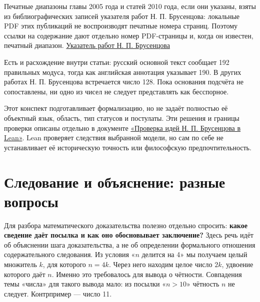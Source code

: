 \documentclass[12pt,a4paper]{article}
\begin{document}
Печатные диапазоны главы 2005 года и статей 2010 года, если они указаны, взяты из библиографических записей указателя работ Н. П. Брусенцова: локальные PDF этих публикаций не воспроизводят печатные номера страниц. Поэтому ссылки на содержание дают отдельно номер PDF-страницы и, когда он известен, печатный диапазон. \href{https://ternarycomp.cs.msu.ru/Brusentsov/Brusentsov_v2.html}{Указатель работ Н. П. Брусенцова}

Есть и расхождение внутри статьи: русский основной текст сообщает 192 правильных модуса, тогда как английская аннотация указывает 190. В других работах Н. П. Брусенцова встречается число 128. Пока основания подсчёта не сопоставлены, ни одно из чисел не следует представлять как бесспорное.

Этот конспект подготавливает формализацию, но не задаёт полностью её объектный язык, область, тип статусов и постулаты. Эти решения и границы проверки описаны отдельно в документе \href{../research/Проверка-идей-Брусенцова-в-Lean.tex}{«Проверка идей Н. П. Брусенцова в Lean»}. Lean проверяет следствия выбранной модели, но сам по себе не устанавливает её историческую точность или философскую предпочтительность.

\section{Следование и объяснение: разные вопросы}

Для разбора математического доказательства полезно отдельно спросить: \textbf{какое сведение даёт посылка и как оно обосновывает заключение?} Здесь речь идёт об объяснении шага доказательства, а не об определении формального отношения содержательного следования. Из условия «\(n\) делится на 4» мы получаем целый множитель \(k\), для которого \(n=4k\). Через него находим целое число \(2k\), удвоение которого даёт \(n\). Именно это требовалось для вывода о чётности. Совпадения темы «числа» для такого вывода мало: из посылки «\(n>10\)» чётность \(n\) не следует. Контрпример — число 11.
\end{document}
